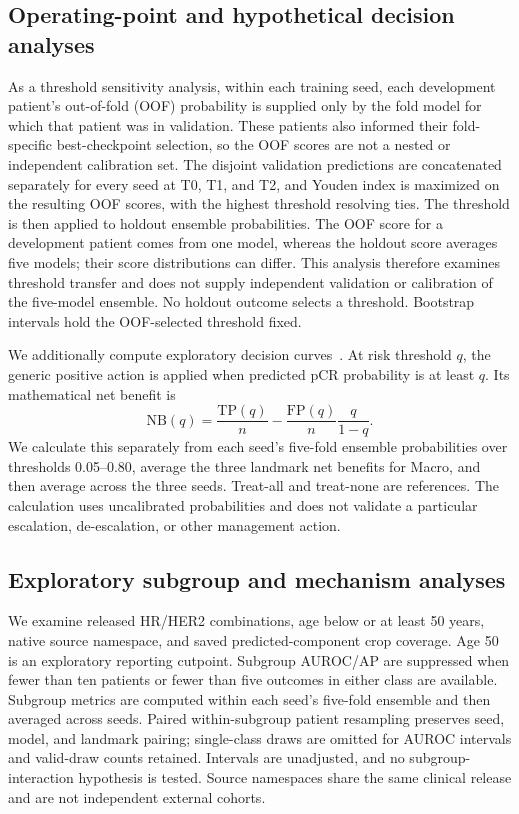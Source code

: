 \subsection{Operating-point and hypothetical decision analyses}
As a threshold sensitivity analysis, within each training seed, each development patient's out-of-fold (OOF) probability is supplied only by the fold model for which that patient was in validation. These patients also informed their fold-specific best-checkpoint selection, so the OOF scores are not a nested or independent calibration set. The disjoint validation predictions are concatenated separately for every seed at T0, T1, and T2, and Youden index is maximized on the resulting OOF scores, with the highest threshold resolving ties. The threshold is then applied to holdout ensemble probabilities. The OOF score for a development patient comes from one model, whereas the holdout score averages five models; their score distributions can differ. This analysis therefore examines threshold transfer and does not supply independent validation or calibration of the five-model ensemble. No holdout outcome selects a threshold. Bootstrap intervals hold the OOF-selected threshold fixed.

We additionally compute exploratory decision curves~\citep{vickers2006dca}. At risk threshold $q$, the generic positive action is applied when predicted pCR probability is at least $q$. Its mathematical net benefit is
\begin{equation}
 \mathrm{NB}(q)=\frac{\mathrm{TP}(q)}{n}
 -\frac{\mathrm{FP}(q)}{n}\frac{q}{1-q}.
\end{equation}
We calculate this separately from each seed's five-fold ensemble probabilities over thresholds 0.05--0.80, average the three landmark net benefits for Macro, and then average across the three seeds. Treat-all and treat-none are references. The calculation uses uncalibrated probabilities and does not validate a particular escalation, de-escalation, or other management action.

\subsection{Exploratory subgroup and mechanism analyses}
We examine released HR/HER2 combinations, age below or at least 50 years, native source namespace, and saved predicted-component crop coverage. Age 50 is an exploratory reporting cutpoint. Subgroup AUROC/AP are suppressed when fewer than ten patients or fewer than five outcomes in either class are available. Subgroup metrics are computed within each seed's five-fold ensemble and then averaged across seeds. Paired within-subgroup patient resampling preserves seed, model, and landmark pairing; single-class draws are omitted for AUROC intervals and valid-draw counts retained. Intervals are unadjusted, and no subgroup-interaction hypothesis is tested. Source namespaces share the same clinical release and are not independent external cohorts.

